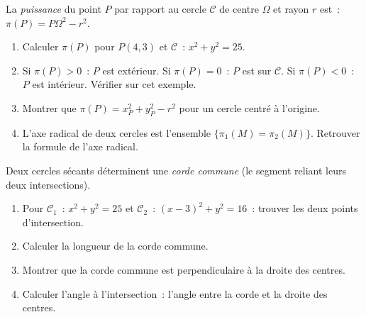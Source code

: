 \begin{challenge}
La \emph{puissance} du point $P$ par rapport au cercle $\mathcal{C}$
de centre $\Omega$ et rayon $r$ est~:
$\pi(P) = P\Omega^2 - r^2.$
\begin{enumerate}
  \item Calculer $\pi(P)$ pour $P(4,3)$ et $\mathcal{C}$~: $x^2+y^2=25$.
  \item Si $\pi(P)>0$~: $P$ est ext\'erieur. Si $\pi(P)=0$~: $P$ est sur $\mathcal{C}$.
        Si $\pi(P)<0$~: $P$ est int\'erieur. V\'erifier sur cet exemple.
  \item Montrer que $\pi(P) = x_P^2+y_P^2-r^2$ pour un cercle centr\'e \`a l'origine.
  \item L'axe radical de deux cercles est l'ensemble $\{\pi_1(M)=\pi_2(M)\}$.
        Retrouver la formule de l'axe radical.
\end{enumerate}
\end{challenge}

\begin{challenge}
Deux cercles s\'ecants d\'eterminent une \emph{corde commune}
(le segment reliant leurs deux intersections).
\begin{enumerate}
  \item Pour $\mathcal{C}_1$~: $x^2+y^2=25$ et $\mathcal{C}_2$~: $(x-3)^2+y^2=16$~:
        trouver les deux points d'intersection.
  \item Calculer la longueur de la corde commune.
  \item Montrer que la corde commune est perpendiculaire \`a la droite des centres.
  \item Calculer l'angle \`a l'intersection~: l'angle entre la corde et la droite
        des centres.
\end{enumerate}
\end{challenge}

